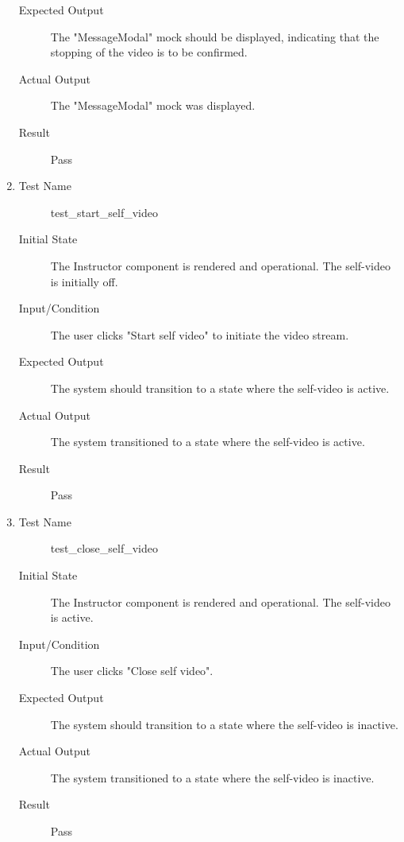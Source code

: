 \documentclass[12pt, titlepage]{article}
\begin{document}
\begin{enumerate}[UT-M1]
\begin{description}
    \item[Expected Output] The "MessageModal" mock should be displayed, indicating that the stopping of the video is to be confirmed.
    \item[Actual Output] The "MessageModal" mock was displayed.
    \item[Result] Pass
    \end{description}
  \item \label{UT-M4}
    \begin{description}
    \item[Test Name] test\_start\_self\_video
    \item[Initial State] The Instructor component is rendered and operational. The self-video is initially off.
    \item[Input/Condition] The user clicks "Start self video" to initiate the video stream.
    \item[Expected Output] The system should transition to a state where the self-video is active.
    \item[Actual Output] The system transitioned to a state where the self-video is active.
    \item[Result] Pass
    \end{description}
  \item \label{UT-M5}
    \begin{description}
    \item[Test Name] test\_close\_self\_video
    \item[Initial State] The Instructor component is rendered and operational. The self-video is active.
    \item[Input/Condition] The user clicks "Close self video".
    \item[Expected Output] The system should transition to a state where the self-video is inactive.
    \item[Actual Output] The system transitioned to a state where the self-video is inactive.
    \item[Result] Pass
    \end{description}
\end{enumerate}
\end{document}
